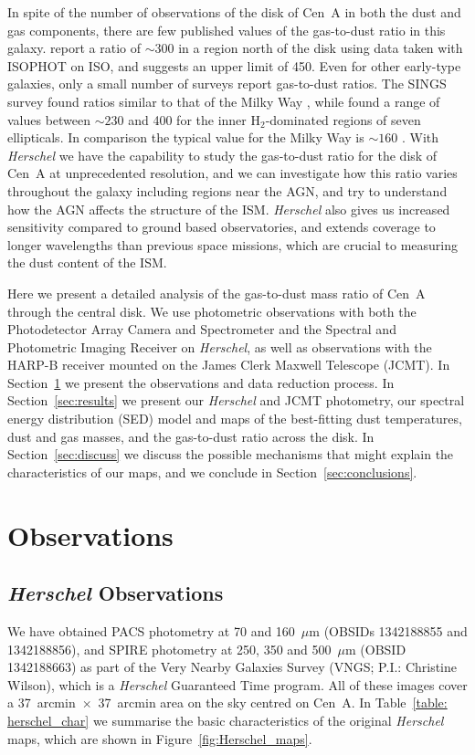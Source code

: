 \documentclass[useAMS,usenatbib,usegraphicx]{mn2e}
\begin{document}
In spite of the number of observations of the disk of Cen~A in both the dust and gas components, there are few published values of the gas-to-dust ratio in this galaxy.  \citet{2004A&A...415...95S} report a ratio of $\sim 300$ in a region north of the disk using data taken with ISOPHOT on ISO, and \citet{1998A&ARv...8..237I} suggests an upper limit of 450.  Even for other early-type galaxies, only a small number of surveys report gas-to-dust ratios.  The SINGS survey found ratios similar to that of the Milky Way \citep{2007ApJ...663..866D}, while \citet{2008ApJ...677..249L} found a range of values between $\sim 230$ and 400 for the inner H$_{2}$-dominated regions of seven ellipticals.  In comparison the typical value for the Milky Way is $\sim 160$ \citep[e.g.][]{2004ApJS..152..211Z}.  With \emph{Herschel} we have the capability to study the gas-to-dust ratio for the disk of Cen~A at unprecedented resolution, and we can investigate how this ratio varies throughout the galaxy including regions near the AGN, and try to understand how the AGN affects the structure of the ISM.  \emph{Herschel} also gives us increased sensitivity compared to ground based observatories, and extends coverage to longer wavelengths than previous space missions, which are crucial to measuring the dust content of the ISM.

Here we present a detailed analysis of the gas-to-dust mass ratio of Cen~A through the central disk.  We use photometric observations with both the Photodetector Array Camera and Spectrometer \citep[PACS;][]{2010A&A...518L...2P} and the Spectral and Photometric Imaging Receiver \citep[SPIRE;][]{2010A&A...518L...3G} on \emph{Herschel}, as well as observations with the HARP-B receiver mounted on the James Clerk Maxwell Telescope (JCMT). In Section~\ref{sec:obs} we present the observations and data reduction process.  In Section~\ref{sec:results} we present our \emph{Herschel} and JCMT photometry, our spectral energy distribution (SED) model and maps of the best-fitting dust temperatures, dust and gas masses, and the gas-to-dust ratio across the disk. In Section~\ref{sec:discuss} we discuss the possible mechanisms that might explain the characteristics of our maps, and we conclude in Section~\ref{sec:conclusions}. 

\section{Observations}\label{sec:obs}
\subsection{\emph{Herschel} Observations}\label{subsec:Herschel}
We have obtained PACS photometry at 70 and 160~$\mu$m (OBSIDs 1342188855 and 1342188856), and SPIRE photometry at 250, 350 and 500~$\mu$m (OBSID 1342188663) as part of the Very Nearby Galaxies Survey (VNGS; P.I.: Christine Wilson), which is a \emph{Herschel} Guaranteed Time program.  All of these images cover a 37~arcmin~$\times$~37~arcmin area on the sky centred on Cen~A.  In Table~\ref{table: herschel_char} we summarise the basic characteristics of the original \emph{Herschel} maps, which are shown in Figure~\ref{fig:Herschel_maps}.
\end{document}
